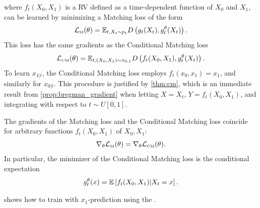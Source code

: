 \documentclass{fairmeta}
\numberwithin{equation}{section}
\begin{document}
where $f_t(X_0,X_1)$ is a RV defined as a time-dependent function of $X_0$ and $X_1$, can be learned by minimizing a Matching loss of the form 
\begin{equation}
    {\mathcal{L}}_{\scriptscriptstyle \text{M}}(\theta) = \mathbb{E}_{t,X_t\sim p_t} D\left (g_t(X_t), g_t^\theta(X_t)\right ).
\end{equation}
This loss has the same gradients as the Conditional Matching loss
\begin{equation}
    {\mathcal{L}}_{\scriptscriptstyle \text{CM}}(\theta) = \mathbb{E}_{t,(X_0,X_1)\sim \pi_{0,1}} D\left (f_t(X_0,X_1), g_t^\theta(X_t)\right ).
\end{equation}
To learn $x_{1|t}$, the Conditional Matching loss employs $f_t(x_0,x_1)=x_1$, and similarly for $x_{0|t}$.
This procedure is justified by  \cref{thm:cm}, which is an immediate result from \cref{prop:bregman_gradient} when letting $X=X_t$, $Y=f_t(X_0,X_1)$, and integrating with respect to $t\sim U[0,1]$.
\begin{myframe}
\begin{theorem}\label{thm:cm}
    The gradients of the Matching loss and the Conditional Matching loss coincide for arbitrary functions $f_t(X_0,X_1)$ of $X_0,X_1$:
    \begin{equation}
        \nabla_\theta {\mathcal{L}}_{\scriptscriptstyle \text{M}}(\theta) = \nabla_\theta {\mathcal{L}}_{\scriptscriptstyle \text{CM}}(\theta).
    \end{equation}
    In particular, the minimizer of the Conditional Matching loss is the conditional expectation
    \begin{equation}        g_t^\theta(x)=\mathbb{E}\left [f_t(X_0,X_1)\vert X_t=x\right ].
    \end{equation} 
\end{theorem}
\end{myframe}
 shows how to train with $x_1$-prediction using the \fmlibrary{}.
\end{document}
